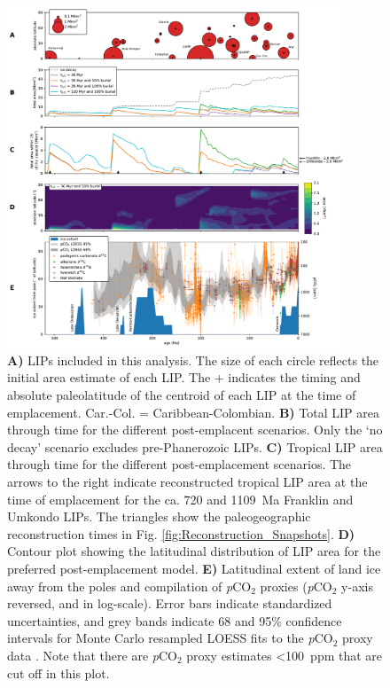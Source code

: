 \documentclass[11pt,letterpaper]{article}
\begin{document}
\begin{figure}[h!]
\begin{center}
	\includegraphics[width=0.9\textwidth]{Manuscript/Figures/LIP_Areas.pdf}
	\caption{\textbf{A)} LIPs included in this analysis. The size of each circle reflects the initial area estimate of each LIP. The + indicates the timing and absolute paleolatitude of the centroid of each LIP at the time of emplacement. Car.-Col. = Caribbean-Colombian. \textbf{B)} Total LIP area through time for the different post-emplacent scenarios. Only the `no decay' scenario excludes pre-Phanerozoic LIPs. \textbf{C)} Tropical LIP area through time for the different post-emplacement scenarios. The arrows to the right indicate reconstructed tropical LIP area at the time of emplacement for the ca. 720 and 1109~Ma Franklin and Umkondo LIPs. The triangles show the paleogeographic reconstruction times in Fig. \ref{fig:Reconstruction_Snapshots}. \textbf{D)} Contour plot showing the latitudinal distribution of LIP area for the preferred post-emplacement model. \textbf{E)} Latitudinal extent of land ice away from the poles \citep{Macdonald2019a} and compilation of \textit{p}CO$_{2}$ proxies \citep{Foster2017a} (\textit{p}CO$_{2}$ y-axis reversed, and in log-scale). Error bars indicate standardized uncertainties, and grey bands indicate 68 and 95\% confidence intervals for Monte Carlo resampled LOESS fits to the \textit{p}CO$_{2}$ proxy data \citep{Foster2017a}. Note that there are \textit{p}CO$_{2}$ proxy estimates \textless100~ppm that are cut off in this plot.}
	\label{fig:LIP_Areas}
\end{center}
\end{figure}
\end{document}
